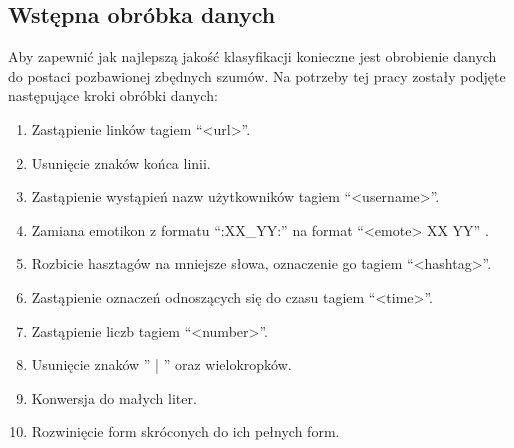\subsection{Wstępna obróbka danych}
Aby zapewnić jak najlepszą jakość klasyfikacji konieczne jest obrobienie danych do postaci pozbawionej zbędnych szumów. Na potrzeby tej pracy zostały podjęte następujące kroki obróbki danych:


\begin{enumerate}
    \item Zastąpienie linków tagiem “<url>”.
    \item Usunięcie znaków końca linii.
    \item Zastąpienie wystąpień nazw użytkowników tagiem  “<username>”.
    \item Zamiana emotikon z formatu “:XX\_YY:” na format “<emote> XX YY” .
    \item Rozbicie hasztagów na mniejsze słowa, oznaczenie go tagiem “<hashtag>”.
    \item Zastąpienie oznaczeń odnoszących się do czasu tagiem “<time>”.
    \item Zastąpienie liczb tagiem “<number>”.
    \item Usunięcie znaków  '' | ''  oraz wielokropków.
    \item Konwersja do małych liter.
    \item Rozwinięcie form skróconych do ich pełnych form.
\end{enumerate}

